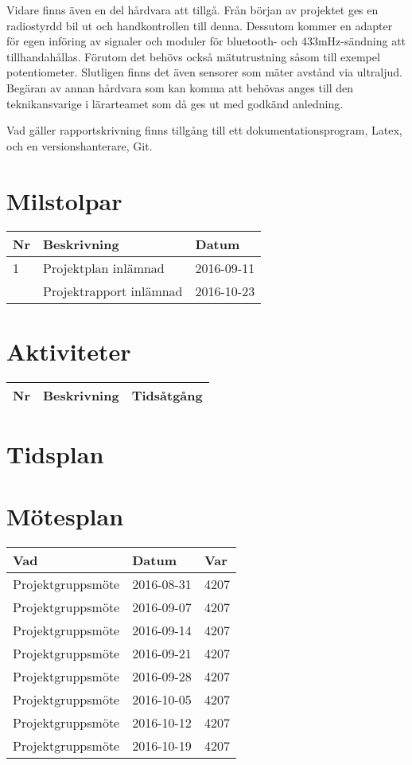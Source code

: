 \documentclass[a4paper]{article}
\begin{document}
Vidare finns även en del hårdvara att tillgå. Från början av projektet ges en radiostyrdd bil ut och handkontrollen till denna. Dessutom kommer en adapter för egen införing av signaler och moduler för bluetooth- och 433mHz-sändning att tillhandahållas. Förutom det behövs också mätutrustning såsom till exempel potentiometer. Slutligen finns det även sensorer som mäter avstånd via ultraljud. Begäran av annan hårdvara som kan komma att behövas anges till den teknikansvarige i lärarteamet som då ges ut med godkänd anledning.
 
Vad gäller rapportskrivning finns tillgång till ett dokumentationsprogram, Latex, och en versionshanterare, Git. 

\section{Milstolpar}

\begin{tabular}{|l|l|l|} \hline
\bf Nr & \bf Beskrivning & \bf Datum \\ \hline \hline
1 & Projektplan inlämnad & 2016-09-11 \\\hline
 & Projektrapport inlämnad & 2016-10-23 \\ \hline

\end{tabular}

\section{Aktiviteter}

\begin{tabular}{|l|l|l|} \hline
\bf Nr & \bf Beskrivning & \bf Tidsåtgång \\ \hline \hline

\end{tabular}

\section{Tidsplan}

\section{Mötesplan}

\begin{tabular}{|l|l|l|} \hline
\bf Vad & \bf Datum & \bf Var \\ \hline \hline
Projektgruppsmöte & 2016-08-31 & 4207 \\ \hline
Projektgruppsmöte & 2016-09-07 & 4207 \\ \hline
Projektgruppsmöte & 2016-09-14 & 4207 \\ \hline
Projektgruppsmöte & 2016-09-21 & 4207 \\ \hline
Projektgruppsmöte & 2016-09-28 & 4207 \\ \hline
Projektgruppsmöte & 2016-10-05 & 4207 \\ \hline
Projektgruppsmöte & 2016-10-12 & 4207 \\ \hline
Projektgruppsmöte & 2016-10-19 & 4207 \\ \hline
\end{tabular}
\end{document}
